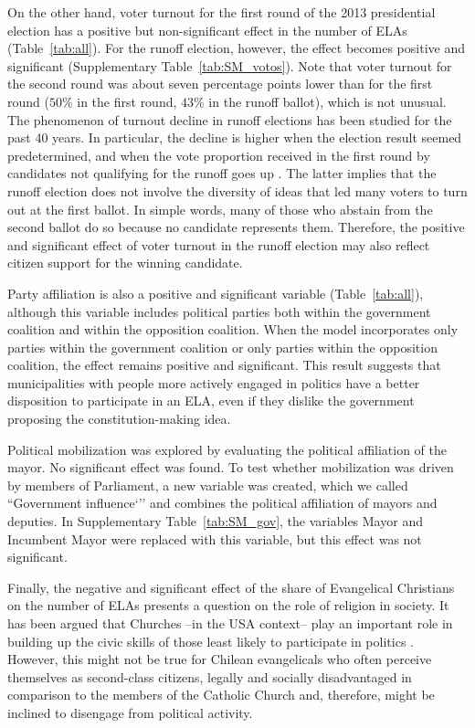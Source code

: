 \documentclass[onecolumn]{article}
\begin{document}
On the other hand, voter turnout for the first round of the 2013 presidential election has a positive but non-significant effect in the number of ELAs (Table~\ref{tab:all}). For the runoff election, however, the effect becomes positive and significant (Supplementary Table~\ref{tab:SM_votos}). Note that voter turnout for the second round was about seven percentage points lower than for the first round ($50\%$ in the first round, $43\%$ in the runoff ballot), which is not unusual. The phenomenon of turnout decline in runoff elections has been studied for the past 40 years. In particular, the decline is higher when the election result seemed predetermined, and when the vote proportion received in the first round by candidates not qualifying for the runoff goes up \cite{pierce1981,wright}. The latter implies that the runoff election does not involve the diversity of ideas that led many voters to turn out at the first ballot. In simple words, many of those who abstain from the second ballot do so because no candidate represents them. Therefore, the positive and significant effect of voter turnout in the runoff election may also reflect citizen support for the winning candidate.

Party affiliation is also a positive and significant variable (Table~\ref{tab:all}), although this variable includes political parties both within the government coalition and within the opposition coalition. When the model incorporates only parties within the government coalition or only parties within the opposition coalition, the effect remains positive and significant. This result suggests that municipalities with people more actively engaged in politics have a better disposition to participate in an ELA, even if they dislike the government proposing the constitution-making idea.

Political mobilization was explored by evaluating the political affiliation of the mayor. No significant effect was found. To test whether mobilization was driven by members of Parliament, a new variable was created, which we called ``Government influence`'' and combines the political affiliation of mayors and deputies. In Supplementary Table~\ref{tab:SM_gov}, the variables Mayor and Incumbent Mayor were replaced with this variable, but this effect was not significant.

Finally, the negative and significant effect of the share of Evangelical Christians on the number of ELAs presents a question on the role of religion in society. It has been argued that Churches --in the USA context-- play an important role in building up the civic skills of those least likely to participate in politics \cite{jones2001}. However, this might not be true for Chilean evangelicals who often perceive themselves as second-class citizens, legally and socially disadvantaged in comparison to the members of the Catholic Church \cite{boas2016} and, therefore, might be inclined to disengage from political activity.
\end{document}

